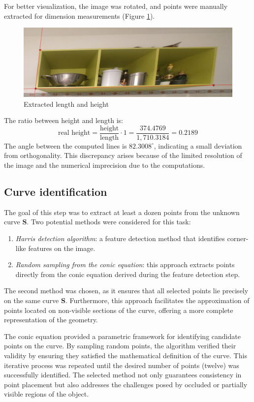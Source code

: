 \documentclass{Academic}
\begin{document}
\noindent For better visualization, the image was rotated, and points were manually extracted for dimension measurements (Figure \ref{fig:ext_height}).
\begin{figure}[!htb]
    \centering
    \includegraphics[width=0.5\linewidth]{images/ext_height.jpg}
    \caption{Extracted length and height}
    \label{fig:ext_height}
\end{figure}
The ratio between height and length is: 
\begin{equation}\text{real height}=\dfrac{\text{height}}{\text{length}} \cdot 1 =\dfrac{374.4769}{1,710.3184} = 0.2189 \end{equation}
The angle between the computed lines is $82.3008^\circ$, indicating a small deviation from orthogonality. 
This discrepancy arises because of the limited resolution of the image and the numerical imprecision due to the computations.

\subsection{Curve identification}
The goal of this step was to extract at least a dozen points from the unknown curve $\mathbf{S}$. 
Two potential methods were considered for this task:
\begin{enumerate}
    \item \textit{Harris detection algorithm}: a feature detection method that identifies corner-like features on the image.
    \item \textit{Random sampling from the conic equation}: this approach extracts points directly from the conic equation derived during the feature detection step.
\end{enumerate}
The second method was chosen, as it ensures that all selected points lie precisely on the same curve $\mathbf{S}$.
 Furthermore, this approach facilitates the approximation of points located on non-visible sections of the curve, offering a more complete representation of the geometry.

The conic equation provided a parametric framework for identifying candidate points on the curve. 
By sampling random points, the algorithm verified their validity by ensuring they satisfied the mathematical definition of the curve. 
This iterative process was repeated until the desired number of points (twelve) was successfully identified. 
The selected method not only guarantees consistency in point placement but also addresses the challenges posed by occluded or partially visible regions of the object.
\end{document}

